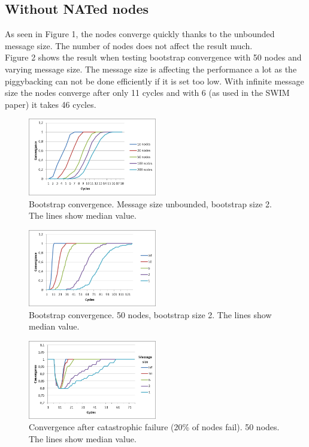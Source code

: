 \documentclass[10pt]{proc}
\begin{document}
\subsection{Without NATed nodes}
As seen in Figure 1, the nodes converge quickly thanks to the unbounded message size. The number of nodes does not affect the result much.
\\[10pt]
Figure 2 shows the result when testing bootstrap convergence with 50 nodes and varying message size. The message size is affecting the performance a lot as the piggybacking can not be done efficiently if it is set too low. With infinite message size the nodes converge after only 11 cycles and with 6 (as used in the SWIM paper) it takes 46 cycles.
\begin{figure}[h!]
\centering
\includegraphics[width=0.5\textwidth]{Fig1.png}
\caption{\label{fig.1}Bootstrap convergence. Message size unbounded, bootstrap size 2. The lines show median value.}
\end{figure}
\begin{figure}[h!]
\centering
\includegraphics[width=0.5\textwidth]{Fig2.png}
\caption{\label{fig.2}Bootstrap convergence. 50 nodes, bootstrap size 2. The lines show median value.}
\end{figure}
\begin{figure}[h!]
\centering
\includegraphics[width=0.5\textwidth]{Fig3.png}
\caption{\label{fig.3}Convergence after catastrophic failure (20\% of nodes fail). 50 nodes. The lines show median value.}
\end{figure}
\end{document}
